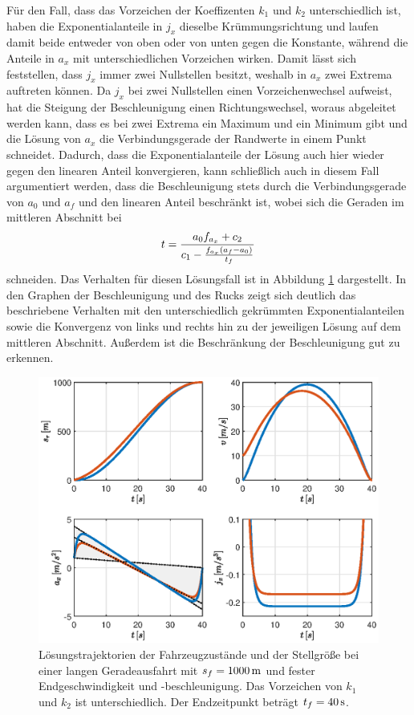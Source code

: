 Für den Fall, dass das Vorzeichen der Koeffizenten $k_1$ und $k_2$ unterschiedlich ist, haben die Exponentialanteile in $j_x$ dieselbe Krümmungsrichtung und laufen damit beide entweder von oben oder von unten gegen die Konstante, während die Anteile in $a_x$ mit unterschiedlichen Vorzeichen wirken. Damit lässt sich feststellen, dass $j_x$ immer zwei Nullstellen besitzt, weshalb in $a_x$ zwei Extrema auftreten können. Da $j_x$ bei zwei Nullstellen einen Vorzeichenwechsel aufweist, hat die Steigung der Beschleunigung einen Richtungswechsel, woraus abgeleitet werden kann, dass es bei zwei Extrema ein Maximum und ein Minimum gibt und die Lösung von $a_x$ die Verbindungsgerade der Randwerte in einem Punkt schneidet. Dadurch, dass die Exponentialanteile der Lösung auch hier wieder gegen den linearen Anteil konvergieren, kann schließlich auch in diesem Fall argumentiert werden, dass die Beschleunigung stets durch die Verbindungsgerade von $a_0$ und $a_f$ und den linearen Anteil beschränkt ist, wobei sich die Geraden im mittleren Abschnitt bei 
\begin{equation}
t = \frac{a_0f_{a_x} + c_2}{c_1 - \frac{f_{a_x}(a_f - a_0)}{t_f}}
\end{equation} 
schneiden. Das Verhalten für diesen Lösungsfall ist in Abbildung \ref{fig:vf_af_fest_unterschiedliches_VZ} dargestellt. In den Graphen der Beschleunigung und des Rucks zeigt sich deutlich das beschriebene Verhalten mit den unterschiedlich gekrümmten Exponentialanteilen sowie die Konvergenz von links und rechts hin zu der jeweiligen Lösung auf dem mittleren Abschnitt. Außerdem ist die Beschränkung der Beschleunigung gut zu erkennen. 
\begin{figure}[h] 
	\centering
	\includegraphics[width=\linewidth]{./Bilder/Ergebnisse/Geradeausfahrt/vf_af_fest_unterschiedliches_VZ.eps}
	\caption{Lösungstrajektorien der Fahrzeugzustände und der Stellgröße bei einer langen Geradeausfahrt mit $s_f=1000\,\mathrm{m}$ und fester Endgeschwindigkeit und -beschleunigung. Das Vorzeichen von $k_1$ und $k_2$ ist unterschiedlich. Der Endzeitpunkt beträgt $t_f = 40\,\mathrm{s}$.}
	\label{fig:vf_af_fest_unterschiedliches_VZ}
\end{figure}


